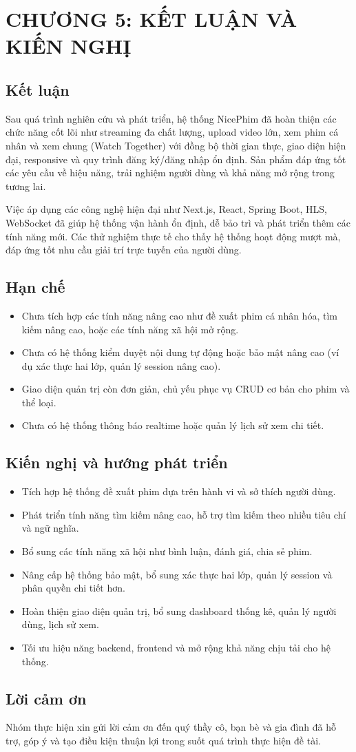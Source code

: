 \newpage

\section{\textbf{CHƯƠNG 5: KẾT LUẬN VÀ KIẾN NGHỊ}}

\subsection{Kết luận}
Sau quá trình nghiên cứu và phát triển, hệ thống NicePhim đã hoàn thiện các chức năng cốt lõi như streaming đa chất lượng, upload video lớn, xem phim cá nhân và xem chung (Watch Together) với đồng bộ thời gian thực, giao diện hiện đại, responsive và quy trình đăng ký/đăng nhập ổn định. Sản phẩm đáp ứng tốt các yêu cầu về hiệu năng, trải nghiệm người dùng và khả năng mở rộng trong tương lai.

Việc áp dụng các công nghệ hiện đại như Next.js, React, Spring Boot, HLS, WebSocket đã giúp hệ thống vận hành ổn định, dễ bảo trì và phát triển thêm các tính năng mới. Các thử nghiệm thực tế cho thấy hệ thống hoạt động mượt mà, đáp ứng tốt nhu cầu giải trí trực tuyến của người dùng.

\subsection{Hạn chế}
\begin{itemize}
	\item Chưa tích hợp các tính năng nâng cao như đề xuất phim cá nhân hóa, tìm kiếm nâng cao, hoặc các tính năng xã hội mở rộng.
	\item Chưa có hệ thống kiểm duyệt nội dung tự động hoặc bảo mật nâng cao (ví dụ xác thực hai lớp, quản lý session nâng cao).
	\item Giao diện quản trị còn đơn giản, chủ yếu phục vụ CRUD cơ bản cho phim và thể loại.
	\item Chưa có hệ thống thông báo realtime hoặc quản lý lịch sử xem chi tiết.
\end{itemize}

\subsection{Kiến nghị và hướng phát triển}
\begin{itemize}
	\item Tích hợp hệ thống đề xuất phim dựa trên hành vi và sở thích người dùng.
	\item Phát triển tính năng tìm kiếm nâng cao, hỗ trợ tìm kiếm theo nhiều tiêu chí và ngữ nghĩa.
	\item Bổ sung các tính năng xã hội như bình luận, đánh giá, chia sẻ phim.
	\item Nâng cấp hệ thống bảo mật, bổ sung xác thực hai lớp, quản lý session và phân quyền chi tiết hơn.
	\item Hoàn thiện giao diện quản trị, bổ sung dashboard thống kê, quản lý người dùng, lịch sử xem.
	\item Tối ưu hiệu năng backend, frontend và mở rộng khả năng chịu tải cho hệ thống.
\end{itemize}

\subsection{Lời cảm ơn}
Nhóm thực hiện xin gửi lời cảm ơn đến quý thầy cô, bạn bè và gia đình đã hỗ trợ, góp ý và tạo điều kiện thuận lợi trong suốt quá trình thực hiện đề tài.

